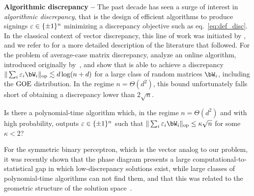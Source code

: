 \myskip 
\textbf{Algorithmic discrepancy --}
The past decade has seen a surge of interest in \emph{algorithmic discrepancy}, that is the design of efficient algorithms to produce signings 
$\varepsilon \in \{\pm 1\}^n$ minimizing a discrepancy objective such as eq.~\eqref{eq:def_disc}. 
In the classical context of vector discrepancy, this line of work was initiated by \cite{bansal2010constructive}, and we refer to \cite{bansal2023resolving,kunisky2023online} for a more detailed description of the 
literature that followed.
For the problem of average-case matrix discrepancy, \cite{kunisky2023online} analyze an online algorithm, introduced originally by~\cite{zouzias2012matrix}, and show that is able to achieve a discrepancy
$\|\sum_i \eps_i \bW_i\|_\op \lesssim d \log(n+d)$ for a large class of random matrices $\bW_i$, including the $\mathrm{GOE}$ distribution.
In the regime $n = \Theta(d^2)$, this bound unfortunately falls short of obtaining a discrepancy lower than $2 \sqrt{n}$. 
\begin{openquestion}\label{op:algorithms}
    Is there a polynomial-time algorithm which, in the regime $n = \Theta(d^2)$ and with high probability, outputs $\varepsilon \in \{\pm 1\}^n$ such that
   $\|\sum_{i} \eps_i \bW_i\|_\op \leq \kappa \sqrt{n}$
    for some $\kappa < 2$?
\end{openquestion}
\noindent
For the symmetric binary perceptron, which is the vector analog to our problem, it was recently shown that the phase diagram presents a large computational-to-statistical gap
in which low-discrepancy solutions exist, while large classes of polynomial-time algorithms can not find them, and that this was related to the geometric structure of the solution space~\citep{bansal2020line,gamarnik2022algorithms}.